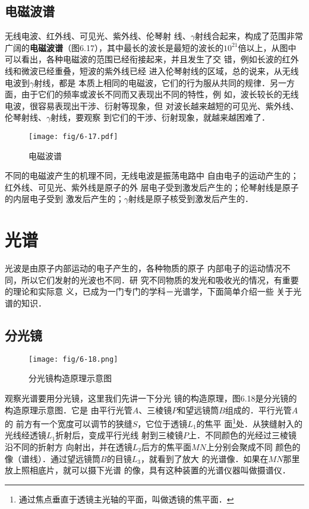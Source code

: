 \subsection{电磁波谱}

无线电波、红外线、可见光、紫外线、伦琴射
线、$\gamma$射线合起来，构成了范围非常广阔的\textbf{电磁波谱}（图6.17），其中最长的波长是最短的波长的$10^{21}$倍以上，从图中
可以看出，各种电磁波的范围已经衔接起来，并且发生了交
错，例如长波的红外线和微波已经重叠，短波的紫外线已经
进入伦琴射线的区域，总的说来，从无线电波到$\gamma$射线，都是
本质上相同的电磁波，它们的行为服从共同的规律．另一方
面，由于它们的频率或波长不同而又表现出不同的特性，例
如，波长较长的无线电波，很容易表现出干涉、衍射等现象，但
对波长越来越短的可见光、紫外线、伦琴射线、$\gamma$射线，要观察
到它们的干涉、衍射现象，就越来越困难了．

\begin{figure}[htp]\centering
    \texttt{[image: fig/6-17.pdf]}
    \caption{电磁波谱}
    \end{figure}

不同的电磁波产生的机理不同，无线电波是振荡电路中
自由电子的运动产生的；红外线、可见光、紫外线是原子的外
层电子受到激发后产生的；伦琴射线是原子的内层电子受到
激发后产生的；$\gamma$射线是原子核受到激发后产生的．

\section{光谱}
光波是由原子内部运动的电子产生的，各种物质的原子
内部电子的运动情况不同，所以它们发射的光波也不同．研
究不同物质的发光和吸收光的情况，有重要的理论和实际意
义，已成为一门专门的学科－光谱学，下面简单介绍一些
关于光谱的知识．

\subsection{分光镜}
\begin{figure}[htp]\centering
    \texttt{[image: fig/6-18.png]}
    \caption{分光镜构造原理示意图}
    \end{figure}

观察光谱要用分光镜，这里我们先讲一下分光
镜的构造原理，图6.18是分光镜的构造原理示意图．它是
由平行光管$A$、三棱镜$P$和望远镜筒$B$组成的．平行光管$A$的
前方有一个宽度可以调节的狭缝$S$，它位于透镜$L_1$的焦平
面\footnote{通过焦点垂直于透镜主光轴的平面，叫做透镜的焦平面．}处．从狭缝射入的光线经透镜$L_1$折射后，变成平行光线
射到三棱镜$P$上．不同颜色的光经过三棱镜沿不同的折射方
向射出，并在透镜$L_2$后方的焦平面$MN$上分别会聚成不同
颜色的像（谱线）．通过望远镜筒$B$的目镜$L_3$，就看到了放大
的光谱像．如果在$MN$那里放上照相底片，就可以摄下光谱
的像，具有这种装置的光谱仪器叫做摄谱仪．

